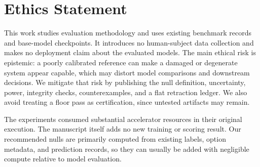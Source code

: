 \section{Ethics Statement}

This work studies evaluation methodology and uses existing benchmark records and base-model checkpoints. It introduces no human-subject data collection and makes no deployment claim about the evaluated models. The main ethical risk is epistemic: a poorly calibrated reference can make a damaged or degenerate system appear capable, which may distort model comparisons and downstream decisions. We mitigate that risk by publishing the null definition, uncertainty, power, integrity checks, counterexamples, and a flat retraction ledger. We also avoid treating a floor pass as certification, since untested artifacts may remain.

The experiments consumed substantial accelerator resources in their original execution. The manuscript itself adds no new training or scoring result. Our recommended nulls are primarily computed from existing labels, option metadata, and prediction records, so they can usually be added with negligible compute relative to model evaluation.
